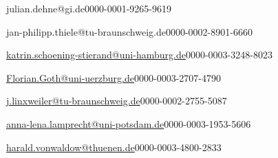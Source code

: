 


\author[1]{Julian Dehne}{julian.dehne@gi.de}{0000-0001-9265-9619}
\author[2]{Jan Philipp Thiele}{jan-philipp.thiele@tu-braunschweig.de}{0000-0002-8901-6660}
\author[3]{Katrin Schöning-Stierand}{\href{mailto:katrin.schoening-stierand@uni-hamburg.de}{katrin.schoening-stierand@uni-hamburg.de}}{0000-0003-3248-8023}
\author[4]{Florian Goth}{\href{mailto:Florian.Goth@uni-wuerzburg.de}{Florian.Goth@uni-uerzburg.de}}{0000-0003-2707-4790}
\author[5]{Jan Linxweiler}{\href{mailto:j.linxweiler@tu-braunschweig.de}{j.linxweiler@tu-braunschweig.de}}{0000-0002-2755-5087}
\author[6]{Anna-Lena Lamprecht}{\href{mailto:anna-lena.lamprecht@uni-potsdam.de}{anna-lena.lamprecht@uni-potsdam.de}}{0000-0003-1953-5606}
\author[7]{Harald von Waldow}{\href{mailto:harald.vonwaldow@thuenen.de}{harald.vonwaldow@thuenen.de}}{0000-0003-4800-2833}

